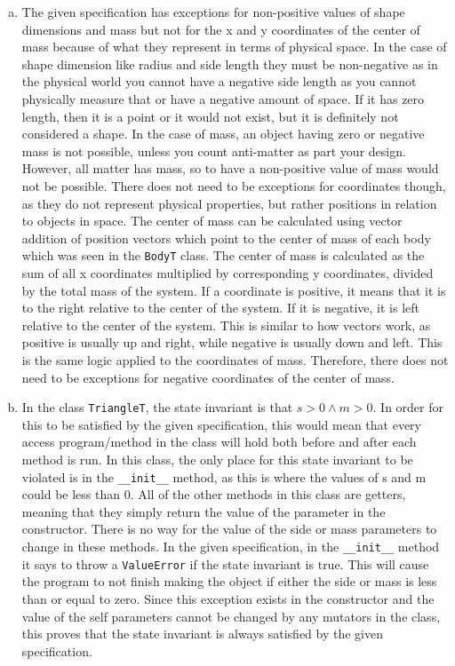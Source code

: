 \documentclass[12pt]{article}
\begin{document}
\begin{enumerate}[a)]
\item The given specification has exceptions for non-positive values of shape dimensions and mass 
but not for the x and y coordinates of the center of mass because of what they represent in terms 
of physical space. In the case of shape dimension like radius and side length they must be 
non-negative as in the physical world you cannot have a negative side length as you cannot 
physically measure that or have a negative amount of space. If it has zero length, then it is a 
point or it would not exist, but it is definitely not considered a shape. In the case of mass, an 
object having zero or negative mass is not possible, unless you count anti-matter as part your 
design. However, all matter has mass, so to have a non-positive value of mass would not be 
possible. There does not need to be exceptions for coordinates though, as they do not represent 
physical properties, but rather positions in relation to objects in space. The center of mass can 
be calculated using vector addition of position vectors which point to the center of mass of each 
body which was seen in the \verb|BodyT| class. The center of mass is calculated as the sum of all 
x coordinates multiplied by corresponding y coordinates, divided by the total mass of the system. 
If a coordinate is positive, it means that it is to the right relative to the center of the 
system. If it is negative, it is left relative to the center of the system. This is similar to 
how vectors work, as positive is usually up and right, while negative is usually down and left. 
This is the same logic applied to the coordinates of mass. Therefore, there does not need to be 
exceptions for negative coordinates of the center of mass. 

\item In the class \verb|TriangleT|, the state invariant is that $s > 0 \land m > 0$. In order 
for this to be satisfied by the given specification, this would mean that every access 
program/method in the class will hold both before and after each method is run. In this class, 
the only place for this state invariant to be violated is in the \verb|__init__| method, as this
is where the values of s and m could be less than 0. All of the other methods in this class are 
getters, meaning that they simply return the value of the parameter in the constructor. There is 
no way for the value of the side or mass parameters to change in these methods. In the given 
specification, in the \verb|__init__| method it says to throw a \verb|ValueError| if the state 
invariant is true. This will cause the program to not finish making the object if either the side 
or mass is less than or equal to zero. Since this exception exists in the constructor and the 
value of the self parameters cannot be changed by any mutators in the class, this proves that the 
state invariant is always satisfied by the given specification. 


\end{enumerate}
\end{document}
